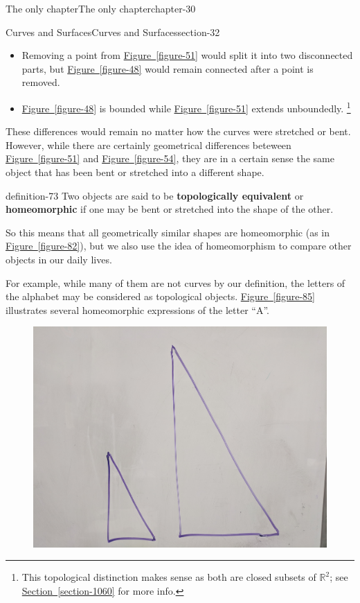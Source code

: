 \documentclass[oneside,10pt,]{book}
\newcommand{\terminology}[1]{\textbf{#1}}
\begin{document}
\begin{chapterptx}{The only chapter}{}{The only chapter}{}{}{chapter-30}
\begin{sectionptx}{Curves and Surfaces}{}{Curves and Surfaces}{}{}{section-32}
\begin{itemize}[label=\textbullet]
\item{}Removing a point from \hyperref[figure-51]{Figure~\ref{figure-51}} would split it into two disconnected parts, but \hyperref[figure-48]{Figure~\ref{figure-48}} would remain connected after a point is removed.%
\item{}\hyperref[figure-48]{Figure~\ref{figure-48}} is bounded while \hyperref[figure-51]{Figure~\ref{figure-51}} extends unboundedly. \footnote{This topological distinction makes sense as both are closed subsets of \(\mathbb R^2\); see \hyperref[section-1060]{Section~\ref{section-1060}} for more info.\label{fn-67}}%
\end{itemize}
\hypertarget{p-70}{}%
These differences would remain no matter how the curves were stretched or bent. However, while there are certainly geometrical differences beteween \hyperref[figure-51]{Figure~\ref{figure-51}} and \hyperref[figure-54]{Figure~\ref{figure-54}}, they are in a certain sense the same object that has been bent or stretched into a different shape.%
\begin{definition}{}{definition-73}%
\hypertarget{p-74}{}%
Two objects are said to be \terminology{topologically equivalent} or \terminology{homeomorphic} if one may be bent or stretched into the shape of the other.%
\end{definition}
\hypertarget{p-77}{}%
So this means that all geometrically similar shapes are homeomorphic (as in \hyperref[figure-82]{Figure~\ref{figure-82}}), but we also use the idea of homeomorphism to compare other objects in our daily lives.%
\par
\hypertarget{p-79}{}%
For example, while many of them are not curves by our definition, the letters of the alphabet may be considered as topological objects. \hyperref[figure-85]{Figure~\ref{figure-85}} illustrates several homeomorphic expressions of the letter ``A''.%
\begin{figure}
\centering
\includegraphics[width=1\linewidth]{images/similar-triangles.jpg}

\end{figure}
\end{sectionptx}
\end{chapterptx}
\end{document}
